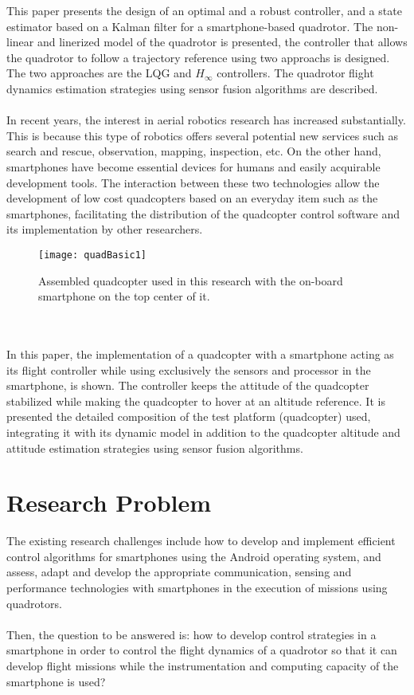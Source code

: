 This paper presents the design of an optimal and a robust controller, and a state estimator based on a Kalman filter for a smartphone-based quadrotor. The non-linear and linerized model of the quadrotor is presented, the controller that allows the quadrotor to follow a trajectory reference using two approachs is designed. The two approaches are the LQG and $H_\infty$ controllers. The quadrotor flight dynamics estimation strategies using sensor fusion algorithms are described. 
\\\\
In recent years, the interest in aerial robotics research has increased substantially. This is because this type of robotics offers several potential new services such as search and rescue, observation, mapping, inspection, etc. On the other hand, smartphones have become essential devices for humans and easily acquirable development tools. The interaction between these two technologies allow the development of low cost quadcopters based on an everyday item such as the smartphones, facilitating the distribution of the quadcopter control software and its implementation by other researchers.
\begin{figure}[h]
\begin{center}
\texttt{[image: quadBasic1]}    
\caption{Assembled quadcopter used in this research with the on-board smartphone on the top center of it.} 
\label{fig:quads500}
\end{center}
\end{figure}
\\\\
In this paper, the implementation of a quadcopter with a smartphone acting as its flight controller while using exclusively the sensors and processor in the smartphone, is shown. The controller keeps the attitude of the quadcopter stabilized while making the quadcopter to hover at an altitude reference. It is presented the detailed composition of the test platform (quadcopter) used, integrating it with its dynamic model in addition to the quadcopter altitude and attitude estimation strategies using sensor fusion algorithms.

\section{Research Problem}
The existing research challenges include how to develop and implement efficient control algorithms for smartphones using the Android operating system, and assess, adapt and develop the appropriate communication, sensing and performance technologies with smartphones in the execution of missions using quadrotors.
\\\\
Then, the question to be answered is: how to develop control strategies in a smartphone in order to control the flight dynamics of a quadrotor so that it can develop flight missions while the instrumentation and computing capacity of the smartphone is used?
